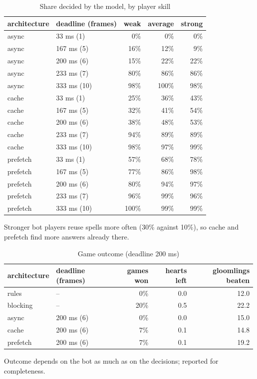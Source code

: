 \begin{table}[ht]
\centering
\small
\caption{Share decided by the model, by player skill}
\label{tab:sweep-skill}
\begin{tabular}{llrrr}
\toprule
architecture & deadline (frames) & weak & average & strong \\
\midrule
async & 33 ms (1) & 0\% & 0\% & 0\% \\
async & 167 ms (5) & 16\% & 12\% & 9\% \\
async & 200 ms (6) & 15\% & 22\% & 22\% \\
async & 233 ms (7) & 80\% & 86\% & 86\% \\
async & 333 ms (10) & 98\% & 100\% & 98\% \\
cache & 33 ms (1) & 25\% & 36\% & 43\% \\
cache & 167 ms (5) & 32\% & 41\% & 54\% \\
cache & 200 ms (6) & 38\% & 48\% & 53\% \\
cache & 233 ms (7) & 94\% & 89\% & 89\% \\
cache & 333 ms (10) & 98\% & 97\% & 99\% \\
prefetch & 33 ms (1) & 57\% & 68\% & 78\% \\
prefetch & 167 ms (5) & 77\% & 86\% & 98\% \\
prefetch & 200 ms (6) & 80\% & 94\% & 97\% \\
prefetch & 233 ms (7) & 96\% & 99\% & 96\% \\
prefetch & 333 ms (10) & 100\% & 99\% & 99\% \\
\bottomrule
\end{tabular}
\par\smallskip\footnotesize Stronger bot players reuse spells more often (30\% against 10\%), so cache and prefetch find more answers already there.
\end{table}

\begin{table}[ht]
\centering
\small
\caption{Game outcome (deadline 200 ms)}
\label{tab:sweep-outcome}
\begin{tabular}{llrrr}
\toprule
architecture & deadline (frames) & games won & hearts left & gloomlings beaten \\
\midrule
rules & -- & 0\% & 0.0 & 12.0 \\
blocking & -- & 20\% & 0.5 & 22.2 \\
async & 200 ms (6) & 0\% & 0.0 & 15.0 \\
cache & 200 ms (6) & 7\% & 0.1 & 14.8 \\
prefetch & 200 ms (6) & 7\% & 0.1 & 19.2 \\
\bottomrule
\end{tabular}
\par\smallskip\footnotesize Outcome depends on the bot as much as on the decisions; reported for completeness.
\end{table}

